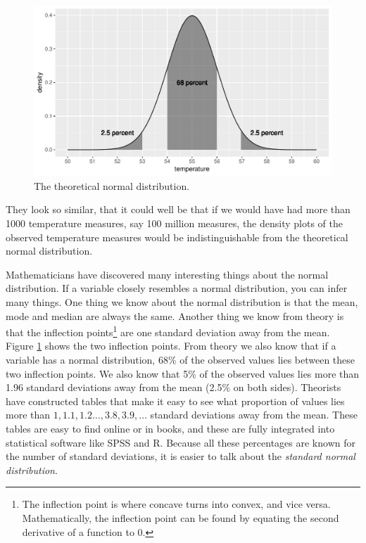 \documentclass[]{report}\usepackage[]{graphicx}\usepackage[]{color}
\makeatletter
\def\maxwidth{ %
  \ifdim\Gin@nat@width>\linewidth
    \linewidth
  \else
    \Gin@nat@width
  \fi
}
\newenvironment{knitrout}{}{} %
\makeatother
\begin{document}
\begin{knitrout}
\color{fgcolor}\begin{figure}

{\centering \includegraphics[width=\maxwidth]{figure/distr_4-1} 

}

\caption[The theoretical normal distribution]{The theoretical normal distribution.}\label{fig:distr_4}
\end{figure}


\end{knitrout}

They look so similar, that it could well be that if we would have had more than 1000 temperature measures, say 100 million measures, the density plots of the observed temperature measures would be indistinguishable from the theoretical normal distribution. 

Mathematicians have discovered many interesting things about the normal distribution. If a variable closely resembles a normal distribution, you can infer many things. One thing we know about the normal distribution is that the mean, mode and median are always the same. Another thing we know from theory is that the inflection points\footnote{The inflection point is where concave turns into convex, and vice versa. Mathematically, the inflection point can be found by equating the second derivative of a function to 0.} are one standard deviation away from the mean.  Figure \ref{fig:distr_4} shows the two inflection points. From theory we also know that if a variable has a normal distribution, 68\% of the observed values lies between these two inflection points. We also know that 5\% of the observed values lies more than 1.96 standard deviations away from the mean (2.5\% on both sides). Theorists have constructed tables that make it easy to see what proportion of values lies more than $1, 1.1, 1.2 \dots, 3.8, 3.9, \dots$ standard deviations away from the mean. These tables are easy to find online or in books, and these are fully integrated into statistical software like SPSS and R. Because all these percentages are known for the number of standard deviations, it is easier to talk about the \textit{standard normal distribution}. 
\end{document}
